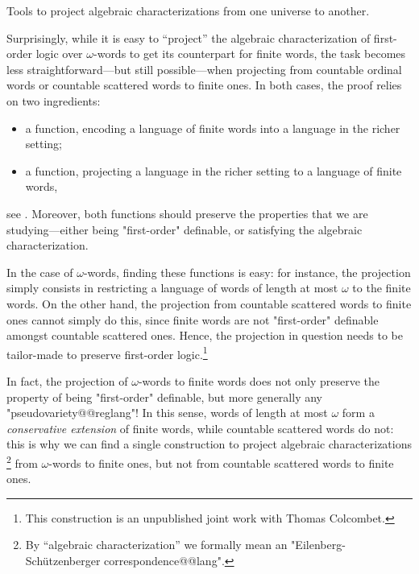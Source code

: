 \begin{marginfigure}
	\centering
	\begin{tikzpicture}
		
	\end{tikzpicture}
	\caption{
		\AP\label{fig:adjunction-informal}
		Tools to project algebraic characterizations from one universe to another.
	}
\end{marginfigure}
Surprisingly, while it is easy to ``project'' the algebraic characterization
of first-order logic over $\omega$-words to get its counterpart for finite words,
the task becomes less straightforward---but still possible---when projecting from
countable ordinal words or countable scattered words to finite ones.
In both cases, the proof relies on two ingredients:
\begin{itemize}
	\item a function, encoding a language of finite words into
		a language in the richer setting;
	\item a function, projecting a language in the richer setting
		to a language of finite words,
\end{itemize}
see .
Moreover, both functions should preserve the properties that we are studying---either
being "first-order" definable, or satisfying the algebraic characterization.

In the case of $\omega$-words, finding these functions is easy: for instance, 
the projection simply consists in restricting a language of words of
length at most $\omega$ to the finite words.
On the other hand, the projection from countable scattered words
to finite ones cannot simply do this, since finite words are not
"first-order" definable amongst countable scattered ones.
Hence, the projection in question needs to be tailor-made to 
preserve first-order logic.\footnote{This construction is an unpublished joint
work with Thomas Colcombet.}

In fact, the projection of $\omega$-words to finite words does not only preserve
the property of being "first-order" definable, but more generally any
"pseudovariety@@reglang"! In this sense, words of length at most $\omega$
form a \emph{conservative extension} of finite words, while
countable scattered words do not: this is why we can find a single construction
to project algebraic characterizations%
\footnote{By ``algebraic characterization'' we formally mean an "Eilenberg-Schützenberger correspondence@@lang".}
from $\omega$-words to finite ones, but not from countable scattered words to finite ones.

